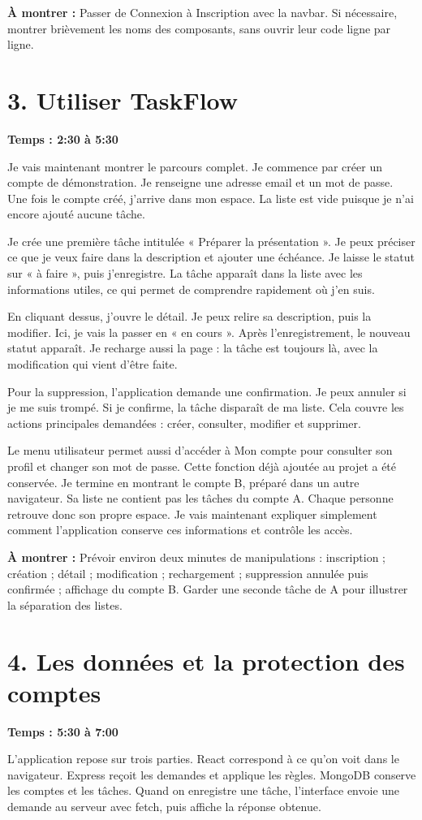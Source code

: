 \documentclass[11pt,a4paper]{article}
\newcommand{\partie}[2]{\section*{\textcolor{forest}{#1}}\textbf{Temps : #2}\par}
\newcommand{\action}[1]{\par\textcolor{muted}{\textbf{À montrer :} #1}\par}
\begin{document}
\action{Passer de Connexion à Inscription avec la navbar. Si nécessaire, montrer brièvement les noms des composants, sans ouvrir leur code ligne par ligne.}

\newpage
\partie{3. Utiliser TaskFlow}{2:30 à 5:30}

Je vais maintenant montrer le parcours complet. Je commence par créer un compte de démonstration. Je renseigne une adresse email et un mot de passe. Une fois le compte créé, j'arrive dans mon espace. La liste est vide puisque je n'ai encore ajouté aucune tâche.

Je crée une première tâche intitulée « Préparer la présentation ». Je peux préciser ce que je veux faire dans la description et ajouter une échéance. Je laisse le statut sur « à faire », puis j'enregistre. La tâche apparaît dans la liste avec les informations utiles, ce qui permet de comprendre rapidement où j'en suis.

En cliquant dessus, j'ouvre le détail. Je peux relire sa description, puis la modifier. Ici, je vais la passer en « en cours ». Après l'enregistrement, le nouveau statut apparaît. Je recharge aussi la page : la tâche est toujours là, avec la modification qui vient d'être faite.

Pour la suppression, l'application demande une confirmation. Je peux annuler si je me suis trompé. Si je confirme, la tâche disparaît de ma liste. Cela couvre les actions principales demandées : créer, consulter, modifier et supprimer.

Le menu utilisateur permet aussi d'accéder à Mon compte pour consulter son profil et changer son mot de passe. Cette fonction déjà ajoutée au projet a été conservée. Je termine en montrant le compte B, préparé dans un autre navigateur. Sa liste ne contient pas les tâches du compte A. Chaque personne retrouve donc son propre espace. Je vais maintenant expliquer simplement comment l'application conserve ces informations et contrôle les accès.

\action{Prévoir environ deux minutes de manipulations : inscription ; création ; détail ; modification ; rechargement ; suppression annulée puis confirmée ; affichage du compte B. Garder une seconde tâche de A pour illustrer la séparation des listes.}

\newpage
\partie{4. Les données et la protection des comptes}{5:30 à 7:00}

L'application repose sur trois parties. React correspond à ce qu'on voit dans le navigateur. Express reçoit les demandes et applique les règles. MongoDB conserve les comptes et les tâches. Quand on enregistre une tâche, l'interface envoie une demande au serveur avec fetch, puis affiche la réponse obtenue.
\end{document}
